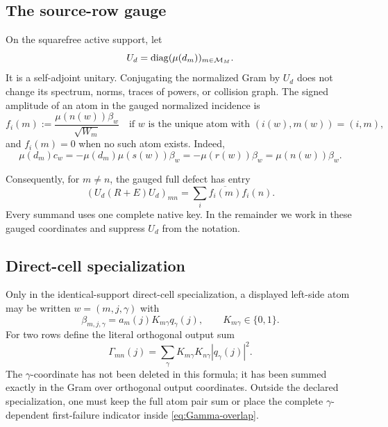 \subsection{The source-row gauge}

On the squarefree active support, let
\begin{equation}
 U_d=\operatorname{diag}(\mu(d_m))_{m\in\mathcal M_M}.
 \label{eq:row-gauge}
\end{equation}
It is a self-adjoint unitary.  Conjugating the normalized Gram by \(U_d\)
does not change its spectrum, norms, traces of powers, or collision graph.
The signed amplitude of an atom in the gauged normalized incidence is
\begin{equation}
 f_i(m)
 :=
 \frac{\mu(n(w))\beta_w}{\sqrt{W_m}}
 \quad\text{if }w\text{ is the unique atom with }
 (i(w),m(w))=(i,m),
 \label{eq:gauged-key-amplitude}
\end{equation}
and \(f_i(m)=0\) when no such atom exists.  Indeed,
\[
 \mu(d_m)c_w
 =-\mu(d_m)\mu(s(w))\beta_w
 =-\mu(r(w))\beta_w
 =\mu(n(w))\beta_w.
\]

Consequently, for \(m\ne n\), the gauged full defect has entry
\begin{equation}
 (U_d(R+E)U_d)_{mn}
 =
 \sum_i\overline{f_i(m)}f_i(n).
 \label{eq:gauged-full-entry}
\end{equation}
Every summand uses one complete native key.  In the remainder we work in
these gauged coordinates and suppress \(U_d\) from the notation.

\subsection{Direct-cell specialization}

Only in the identical-support direct-cell specialization, a displayed
left-side atom may be written \(w=(m,j,\gamma)\) with
\begin{equation}
 \beta_{m,j,\gamma}
 =a_m(j)K_{m\gamma}q_\gamma(j),
 \qquad
 K_{m\gamma}\in\{0,1\}.
 \label{eq:direct-cell-factorization}
\end{equation}
For two rows define the literal orthogonal output sum
\begin{equation}
 \Gamma_{mn}(j)
 =
 \sum_\gamma
 K_{m\gamma}K_{n\gamma}|q_\gamma(j)|^2.
 \label{eq:Gamma-overlap}
\end{equation}
The \(\gamma\)-coordinate has not been deleted in this formula; it has been
summed exactly in the Gram over orthogonal output coordinates.  Outside the
declared specialization, one must keep the full atom pair sum or place the
complete \(\gamma\)-dependent first-failure indicator inside
\eqref{eq:Gamma-overlap}.

